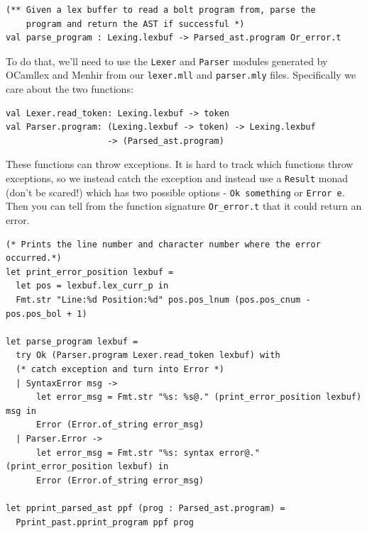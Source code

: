 %

\begin{lstlisting}[caption={lex\_and\_parse.mli},language=caml]
(** Given a lex buffer to read a bolt program from, parse the
    program and return the AST if successful *)
val parse_program : Lexing.lexbuf -> Parsed_ast.program Or_error.t
\end{lstlisting}

To do that, we'll need to use the \texttt{Lexer} and \texttt{Parser}
modules generated by OCamllex and Menhir from our \texttt{lexer.mll} and
\texttt{parser.mly} files. Specifically we care about the two functions:


\begin{lstlisting}[language=caml]
val Lexer.read_token: Lexing.lexbuf -> token
val Parser.program: (Lexing.lexbuf -> token) -> Lexing.lexbuf
                    -> (Parsed_ast.program)
\end{lstlisting}

These functions can throw exceptions. It is hard to track which
functions throw exceptions, so we instead catch the exception and
instead use a \texttt{Result} monad (don't be scared!) which has two
possible options - \texttt{Ok\ something} or \texttt{Error\ e}. Then you
can tell from the function signature \texttt{Or\_error.t} that it could
return an error.

%

\begin{lstlisting}[caption={{lex\_and\_parse.ml}},language=caml]
(* Prints the line number and character number where the error occurred.*)
let print_error_position lexbuf =
  let pos = lexbuf.lex_curr_p in
  Fmt.str "Line:%d Position:%d" pos.pos_lnum (pos.pos_cnum - pos.pos_bol + 1)

let parse_program lexbuf =
  try Ok (Parser.program Lexer.read_token lexbuf) with
  (* catch exception and turn into Error *)
  | SyntaxError msg ->
      let error_msg = Fmt.str "%s: %s@." (print_error_position lexbuf) msg in
      Error (Error.of_string error_msg)
  | Parser.Error ->
      let error_msg = Fmt.str "%s: syntax error@." (print_error_position lexbuf) in
      Error (Error.of_string error_msg)

let pprint_parsed_ast ppf (prog : Parsed_ast.program) =
  Pprint_past.pprint_program ppf prog
\end{lstlisting}

